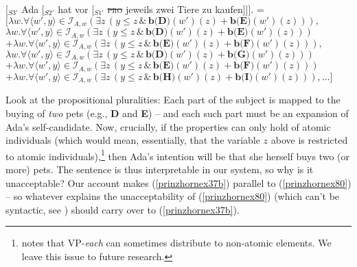 \documentclass[output=paper,colorlinks,citecolor=brown,
]{langscibook}
\begin{document}
\ea
\ea  \label{prinzhornex63a} [$_{S3'}$ Ada [$_{S2'}$ hat vor [$_{S1'}$ \sout{\textsc{pro}} jeweils zwei Tiere zu kaufen]]].
\ex {} = $[\lambda w.  \forall \langle w' ,y \rangle \in \mathcal{I}_{A,w} (\exists  z \,(y \le z\, \& \,\textbf{b(D)}(w')(z)+\textbf{b(E)}(w')(z))),$\\$
\lambda w.  \forall \langle w' ,y \rangle \in \mathcal{I}_{A,w} (\exists  z \,(y \le z\, \& \,\textbf{b(D)}(w')(z)+\textbf{b(E)}(w')(z))) $\\$
+ \lambda w.  \forall \langle w' ,y \rangle \in \mathcal{I}_{A,w} (\exists  z \,(y \le z\, \& \,\textbf{b(E)}(w')(z)+\textbf{b(F)}(w')(z))), $\\$
\lambda w.  \forall \langle w' ,y \rangle \in \mathcal{I}_{A,w} (\exists z\,( y \le z\, \& \,\textbf{b(D)}(w')(z) + \textbf{b(G)}(w')(z)))$\\$ + \lambda w.  \forall \langle w' ,y \rangle \in \mathcal{I}_{A,w} (\exists z \, (y \le z\,\& \,\textbf{b(E)}(w')(z)+\textbf{b(F)}(w')(z))) $\\$ + \lambda w.  \forall \langle w' ,y \rangle \in \mathcal{I}_{A,w} (\exists z \,(y \le z\, \& \,\textbf{b(H)}(w')(z)+\textbf{b(I)}(w')(z))), \dots]$\label{prinzhornex63b}
\z\z

Look at the propositional pluralities: Each part of the subject is mapped  to the buying of \textit{two} pets (e.g., {\bf D} and {\bf E}) -- and each such part must be an expansion of Ada's self-candidate. Now, crucially, if the properties can only hold of atomic individuals (which would mean, essentially, that the variable $z$ above is restricted to atomic individuals),\footnote{\citet{Schwarzschild:1996} notes that VP-\textit{each} can sometimes distribute to non-atomic elements. We leave this issue to future research.} then Ada's intention will be that she herself buys two (or more) pets. The sentence is thus interpretable in our system, so why is it unacceptable? Our account makes (\ref{prinzhornex37b}) parallel to (\ref{prinzhornex80}) -- so whatever explains the unacceptability of (\ref{prinzhornex80}) (which can't be syntactic, see ) should carry over to (\ref{prinzhornex37b}).

\ea 
{}
	\z\z
\end{document}

